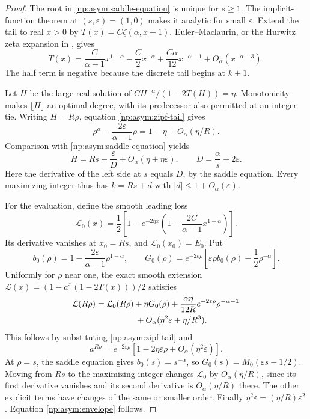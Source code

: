 \documentclass[11pt,a4paper]{article}
\theoremstyle{definition}
\theoremstyle{remark}
\begin{document}
\begin{proof}
The root in \eqref{np:asym:saddle-equation} is unique for $s\geq1$.
The implicit-function theorem at $(s,\varepsilon)=(1,0)$ makes it
analytic for small $\varepsilon$.
Extend the tail to real $x>0$ by $T(x)=C\zeta(\alpha,x+1)$.
Euler--Maclaurin, or the Hurwitz zeta expansion in \cite{dlmf}, gives
\begin{equation}
 T(x)=\frac{C}{\alpha-1}x^{1-\alpha}
          -\frac C2x^{-\alpha}
          +\frac{C\alpha}{12}x^{-\alpha-1}
          +O_\alpha(x^{-\alpha-3}).
 \label{np:asym:zipf-tail}
\end{equation}
The half term is negative because the discrete tail begins at $k+1$.

Let $H$ be the large real solution of
$CH^{-\alpha}/(1-2T(H))=\eta$.  Monotonicity makes
$\lfloor H\rfloor$ an optimal degree, with its predecessor also
permitted at an integer tie.  Writing $H=R\rho$, equation
\eqref{np:asym:zipf-tail} gives
\[
 \rho^\alpha-\frac{2\varepsilon}{\alpha-1}\rho
                  =1-\eta+O_\alpha(\eta/R).
\]
Comparison with \eqref{np:asym:saddle-equation} yields
\begin{equation}
 H=Rs-\frac{\varepsilon}{D}
                  +O_\alpha(\eta+\eta\varepsilon),
 \qquad D=\frac\alpha s+2\varepsilon.
 \label{np:asym:rounding-root}
\end{equation}
Here the derivative of the left side at $s$ equals $D$, by the
saddle equation.  Every maximizing integer thus has
$k=Rs+d$ with $|d|\leq1+O_\alpha(\varepsilon)$.

For the evaluation, define the smooth leading loss
\[
 \mathcal L_0(x)=\frac12\left[1-e^{-2\eta x}
          \left(1-\frac{2C}{\alpha-1}x^{1-\alpha}\right)\right].
\]
Its derivative vanishes at $x_0=Rs$, and
$\mathcal L_0(x_0)=E_0$.
Put
\[
 b_0(\rho)=1-\frac{2\varepsilon}{\alpha-1}\rho^{1-\alpha},
 \qquad
 G_0(\rho)=e^{-2\varepsilon\rho}
       \left[\varepsilon\rho b_0(\rho)-\frac12\rho^{-\alpha}\right].
\]
Uniformly for $\rho$ near one, the exact smooth extension
$\mathcal L(x)=(1-a^x(1-2T(x)))/2$ satisfies
\begin{align}
 \mathcal L(R\rho)
  ={}&\mathcal L_0(R\rho)+\eta G_0(\rho)
       +\frac{\alpha\eta}{12R}
                   e^{-2\varepsilon\rho}\rho^{-\alpha-1}
 \nonumber\\
     &\hspace{12mm}
       +O_\alpha(\eta^2\varepsilon+\eta/R^3).
 \label{np:asym:local-expansion}
\end{align}
This follows by substituting \eqref{np:asym:zipf-tail} and
\[
 a^{R\rho}=e^{-2\varepsilon\rho}
              \left[1-2\eta\varepsilon\rho
                         +O_\alpha(\eta^2\varepsilon)\right].
\]
At $\rho=s$, the saddle equation gives $b_0(s)=s^{-\alpha}$,
so $G_0(s)=M_0(\varepsilon s-1/2)$.
Moving from $Rs$ to the maximizing integer changes
$\mathcal L_0$ by $O_\alpha(\eta/R)$, since its first derivative
vanishes and its second derivative is $O_\alpha(\eta/R)$ there.
The other explicit terms have changes of the same or smaller order.
Finally $\eta^2\varepsilon=(\eta/R)\varepsilon^2$.
Equation \eqref{np:asym:envelope} follows.


\end{proof}
\end{document}
